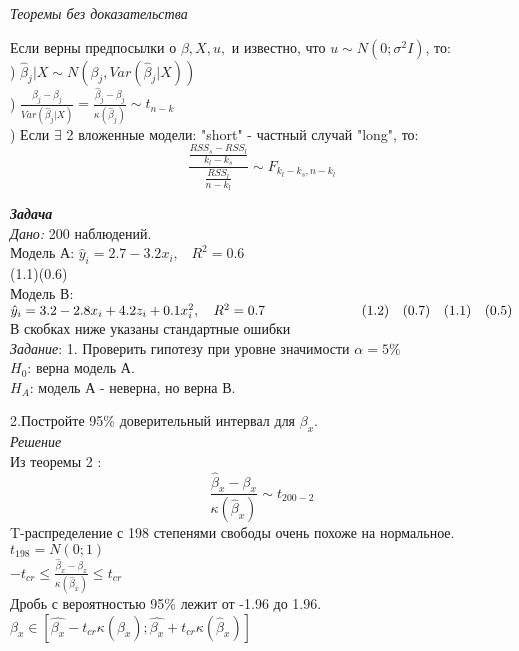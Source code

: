 \documentclass[12pt]{article} %
\theoremstyle{definition} %
\begin{document}
\textit{Теоремы без доказательства}

Если верны предпосылки о $\beta, X, u,$ и известно, что $u \sim N(0;\sigma^2I)$, то: \\
) $\hat{\beta}_j|X \sim N(\beta_j, {Var}(\hat{\beta}_j|X))$
\\
) $\frac{\hat{\beta}_j-\beta_j}{{Var}(\hat{\beta}_j|X)}=\frac{\hat{\beta}_j-\beta_j}{\kappa(\hat{\beta}_j)} \sim t_{n-k}$
\\
) Если $\exists$ 2 вложенные модели: "short" - частный случай "long", то:\\
$$ \frac{\frac{{RSS}_s-RSS_l}{k_l-k_s}}  {\frac{RSS_l}{n-k_l}} \sim F_{k_l-k_s,n-k_l}$$

\textbf{\textit{Задача}}\\
\textit{Дано:} 200 наблюдений.\\
Модель А: $\hat{y}_i=2.7 - 3.2x_i, \hspace{10pt} R^2=0.6$\\
\indent \hspace{2cm} (1.1)\hspace{10pt}(0.6) \\
Модель В: $\hat{y}_i=3.2 - 2.8x_i + 4.2z_i + 0.1x_i^2, \hspace{10pt} R^2=0.7\\
\indent \hspace{2cm}  (1.2) \hspace{10pt} (0.7) \hspace{10pt} (1.1)  \hspace{10pt}  (0.5)$\\
В скобках ниже указаны стандартные ошибки\\
\textit{Задание}:
1. Проверить гипотезу при уровне значимости $\alpha = 5\% $  \\
$H_0$: верна модель А.\\
$H_A$: модель А - неверна, но верна В.

\noindent 2.Постройте 95\% доверительный интервал для $\beta_x.$\\
\textit{Решение}\\Из теоремы 2 :\\
$$ \frac{\hat{\beta}_x-\beta_x}{\kappa(\hat{\beta}_x)}\sim t_{200-2}$$
T-распределение с 198 степенями свободы очень похоже на нормальное.\\
$t_{198} = N(0;1)$\\
$-t_{cr} \leq \frac{\hat{\beta}_x-\beta_x}{\kappa(\hat{\beta}_x)} \leq t_{cr} $\\
Дробь с вероятностью 95\% лежит от -1.96 до 1.96.
$\beta_x \in [\hat{\beta_x} - t_{cr} \kappa(\hat{\beta}_x); \hat{\beta_x} + t_{cr} \kappa(\hat{\beta}_x)]$
\end{document}
